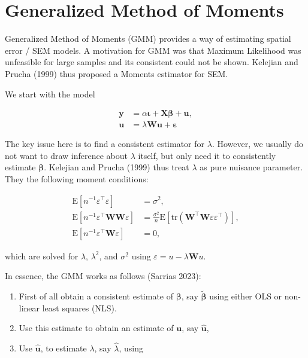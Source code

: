 \documentclass[
  letterpaper,
]{scrbook}
\begin{document}
\hypertarget{generalized-method-of-moments}{%
\section{Generalized Method of
Moments}\label{generalized-method-of-moments}}

Generalized Method of Moments (GMM) provides a way of estimating spatial
error / SEM models. A motivation for GMM was that Maximum Likelihood was
unfeasible for large samples and its consistent could not be shown.
Kelejian and Prucha (1999) thus proposed a Moments estimator for SEM.

We start with the model

\[
        \begin{split}
        {\boldsymbol{\mathbf{y}}}&=\alpha{\boldsymbol{\mathbf{\iota}}}+{\boldsymbol{\mathbf{X}}}{\boldsymbol{\mathbf{\beta}}}+{\boldsymbol{\mathbf{u}}},\\
        {\boldsymbol{\mathbf{u}}}&=\lambda{\boldsymbol{\mathbf{W}}}{\boldsymbol{\mathbf{u}}}+{\boldsymbol{\mathbf{\varepsilon}}}
        \end{split} 
\]

The key issue here is to find a consistent estimator for \(\lambda\).
However, we usually do not want to draw inference about \(\lambda\)
itself, but only need it to consistently estimate
\(\boldsymbol{\mathbf{\beta}}\). Kelejian and Prucha (1999) thus treat
\(\lambda\) as pure nuisance parameter. They the following moment
conditions:

\[
\begin{split}
  \mathrm{E}\left[n^{-1}\varepsilon^\intercal \varepsilon\right] & = \sigma^2, \\
   \mathrm{E}\left[n^{-1}\varepsilon^\intercal\boldsymbol{\mathbf{W}}\boldsymbol{\mathbf{W}}\varepsilon\right] & = \frac{\sigma^2}{n}\mathrm{E}\left[\mathrm{tr}(\boldsymbol{\mathbf{W}}^\intercal\boldsymbol{\mathbf{W}}\varepsilon\varepsilon^\intercal) \right],\\
   \mathrm{E}\left[n^{-1}\varepsilon^\intercal \boldsymbol{\mathbf{W}} \varepsilon \right] & = 0,
\end{split}   
\]

which are solved for \(\lambda\), \(\lambda^2\), and \(\sigma^2\) using
\(\varepsilon = u - \lambda \boldsymbol{\mathbf{W}} u\).

In essence, the GMM works as follows (Sarrias 2023):

\begin{enumerate}
\def\labelenumi{\arabic{enumi})}
\item
  First of all obtain a consistent estimate of
  \(\boldsymbol{\mathbf{\beta}}\), say
  \(\widetilde{\boldsymbol{\mathbf{\beta}}}\) using either OLS or
  non-linear least squares (NLS).
\item
  Use this estimate to obtain an estimate of
  \(\boldsymbol{\mathbf{u}}\), say
  \(\widehat{\boldsymbol{\mathbf{u}}}\),
\item
  Use \(\widehat{\boldsymbol{\mathbf{u}}}\), to estimate \(\lambda\),
  say \(\widehat{\lambda}\), using
\end{enumerate}
\end{document}
